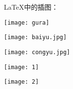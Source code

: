 \documentclass{ctexart}
\begin{document}
    \LaTeX{}中的插图：

    \texttt{[image: gura]}
    
    \texttt{[image: baiyu.jpg]}

    \texttt{[image: congyu.jpg]}

    \texttt{[image: 1]} %


    \texttt{[image: 2]}
\end{document}
